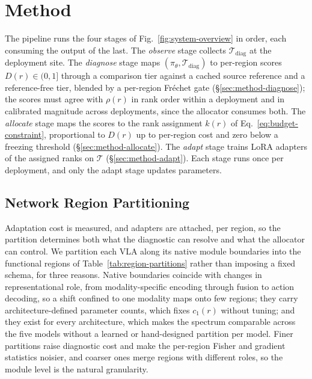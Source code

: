 \section{Method}
\label{sec:method}

The pipeline runs the four stages of Fig.~\ref{fig:system-overview} in order, each consuming the output of the last.
The \emph{observe} stage collects $\mathcal{T}_\text{diag}$ at the deployment site.
The \emph{diagnose} stage maps $(\pi_\theta, \mathcal{T}_\text{diag})$ to per-region scores $D(r) \in (0, 1]$ through a comparison tier against a cached source reference and a reference-free tier, blended by a per-region Fr\'{e}chet gate (\S\ref{sec:method-diagnose}); the scores must agree with $\rho(r)$ in rank order within a deployment and in calibrated magnitude across deployments, since the allocator consumes both.
The \emph{allocate} stage maps the scores to the rank assignment $k(r)$ of Eq.~\ref{eq:budget-constraint}, proportional to $D(r)$ up to per-region cost and zero below a freezing threshold (\S\ref{sec:method-allocate}).
The \emph{adapt} stage trains LoRA adapters of the assigned ranks on $\mathcal{T}$ (\S\ref{sec:method-adapt}).
Each stage runs once per deployment, and only the adapt stage updates parameters.

\subsection{Network Region Partitioning}
\label{sec:method-regions}

Adaptation cost is measured, and adapters are attached, per region, so the partition determines both what the diagnostic can resolve and what the allocator can control.
We partition each VLA along its native module boundaries into the functional regions of Table~\ref{tab:region-partitions} rather than imposing a fixed schema, for three reasons.
Native boundaries coincide with changes in representational role, from modality-specific encoding through fusion to action decoding, so a shift confined to one modality maps onto few regions; they carry architecture-defined parameter counts, which fixes $c_1(r)$ without tuning; and they exist for every architecture, which makes the spectrum comparable across the five models without a learned or hand-designed partition per model.
Finer partitions raise diagnostic cost and make the per-region Fisher and gradient statistics noisier, and coarser ones merge regions with different roles, so the module level is the natural granularity.

